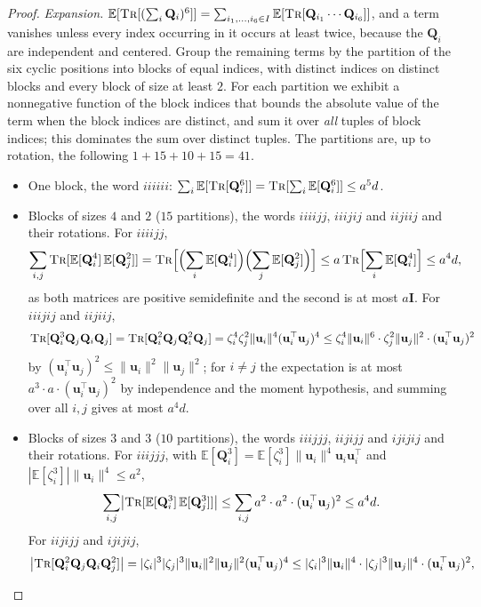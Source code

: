 \documentclass[11pt]{article}
\theoremstyle{remark}
\newcommand{\II}{\mathbf I}
\newcommand{\QQ}{\mathbf Q}
\newcommand{\uu}{\mathbf u}
\newcommand{\Ex}{\mathbb E}
\newcommand{\norm}[1]{\lVert#1\rVert}
\newcommand{\tr}{\textsc{Tr}}
\begin{document}
\begin{proof}
\emph{Expansion.}
$\Ex[\tr[(\sum_i\QQ_i)^{6}]]=\sum_{i_1,\dots,i_6\in I}\Ex[\tr[\QQ_{i_1}\cdots\QQ_{i_6}]]$,
and a term vanishes unless every index occurring in it occurs at least
twice, because the $\QQ_i$ are independent and centered.
Group the remaining terms by the partition of the six cyclic positions
into blocks of equal indices, with distinct indices on distinct blocks and
every block of size at least $2$.
For each partition we exhibit a nonnegative function of the block indices
that bounds the absolute value of the term when the block indices are
distinct, and sum it over \emph{all} tuples of block indices; this
dominates the sum over distinct tuples.
The partitions are, up to rotation, the following $1+15+10+15=41$.
\begin{itemize}[leftmargin=*,itemsep=1pt]
\item One block, the word $iiiiii$:
$\sum_i\Ex[\tr[\QQ_i^{6}]]=\tr[\sum_i\Ex[\QQ_i^{6}]]\le a^{5}d$.
\item Blocks of sizes $4$ and $2$ ($15$ partitions), the words $iiiijj$,
$iiijij$ and $iijiij$ and their rotations.
For $iiiijj$,
\[
\sum_{i,j}\tr[\Ex[\QQ_i^{4}]\,\Ex[\QQ_j^{2}]]
=\tr\Bigl[\Bigl(\sum_i\Ex[\QQ_i^{4}]\Bigr)\Bigl(\sum_j\Ex[\QQ_j^{2}]\Bigr)\Bigr]
\le a\,\tr\Bigl[\sum_i\Ex[\QQ_i^{4}]\Bigr]\le a^{4}d ,
\]
as both matrices are positive semidefinite and the second is at most
$a\II$.
For $iiijij$ and $iijiij$,
\[
\tr[\QQ_i^{3}\QQ_j\QQ_i\QQ_j]=\tr[\QQ_i^{2}\QQ_j\QQ_i^{2}\QQ_j]
=\zeta_i^{4}\zeta_j^{2}\norm{\uu_i}^{4}(\uu_i^{\top}\uu_j)^{4}
\le\zeta_i^{4}\norm{\uu_i}^{6}\cdot\zeta_j^{2}\norm{\uu_j}^{2}\cdot(\uu_i^{\top}\uu_j)^{2}
\]
by $(\uu_i^{\top}\uu_j)^{2}\le\norm{\uu_i}^{2}\norm{\uu_j}^{2}$; for $i\neq j$
the expectation is at most $a^{3}\cdot a\cdot(\uu_i^{\top}\uu_j)^{2}$ by
independence and the moment hypothesis, and summing over all $i,j$ gives
at most $a^{4}d$.
\item Blocks of sizes $3$ and $3$ ($10$ partitions), the words $iiijjj$,
$iijijj$ and $ijijij$ and their rotations.
For $iiijjj$, with $\Ex[\QQ_i^{3}]=\Ex[\zeta_i^{3}]\norm{\uu_i}^{4}\uu_i\uu_i^{\top}$
and $|\Ex[\zeta_i^{3}]|\norm{\uu_i}^{4}\le a^{2}$,
\[
\sum_{i,j}\bigl|\tr[\Ex[\QQ_i^{3}]\,\Ex[\QQ_j^{3}]]\bigr|
\le\sum_{i,j}a^{2}\cdot a^{2}\cdot(\uu_i^{\top}\uu_j)^{2}\le a^{4}d .
\]
For $iijijj$ and $ijijij$,
\begin{align*}
\bigl|\tr[\QQ_i^{2}\QQ_j\QQ_i\QQ_j^{2}]\bigr|
&=|\zeta_i|^{3}|\zeta_j|^{3}\norm{\uu_i}^{2}\norm{\uu_j}^{2}(\uu_i^{\top}\uu_j)^{4}
\le|\zeta_i|^{3}\norm{\uu_i}^{4}\cdot|\zeta_j|^{3}\norm{\uu_j}^{4}\cdot(\uu_i^{\top}\uu_j)^{2},\\

\end{align*}
\end{itemize}
\end{proof}
\end{document}
